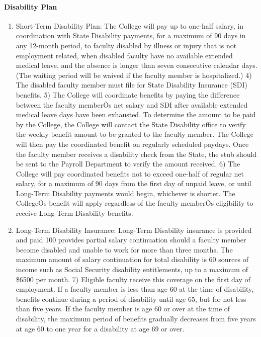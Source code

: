 \documentclass[letterpaper, 11pt]{article}
\begin{document}
			\paragraph{Disability Plan}
				\begin{enumerate}[label=\alph*)]
					\item{Short-Term Disability Plan:  The College will pay up to one-half salary, in coordination with State Disability payments, for a maximum of 90 days in any 12-month period, to faculty disabled by illness or injury that is not employment related, when disabled faculty have no available extended medical leave, and the absence is longer than seven consecutive calendar days.  (The waiting period will be waived if the faculty member is hospitalized.)}
					4) The disabled faculty member must file for State Disability Insurance (SDI) benefits.
					5) The College will coordinate benefits by paying the difference between the faculty memberÕs net salary and SDI after available extended medical leave days have been exhausted.  To determine the amount to be paid by the College, the College will contact the State Disability office to verify the weekly benefit amount to be granted to the faculty member.  The College will then pay the coordinated benefit on regularly scheduled paydays.  Once the faculty member receives a disability check from the State, the stub should be sent to the Payroll Department to verify the amount received.
					6) The College will pay coordinated benefits not to exceed one-half of regular net salary, for a maximum of 90 days from the first day of unpaid leave, or until Long-Term Disability payments would begin, whichever is shorter.  The CollegeÕs benefit will apply regardless of the faculty memberÕs eligibility to receive Long-Term Disability benefits.
					\item{Long-Term Disability Insurance:  Long-Term Disability insurance is provided}
					and paid 100%
					provides partial salary continuation should a faculty member become disabled and
					unable to work for more than three months.  The maximum amount of salary
					continuation for total disability is 60%
					sources of income such as Social Security disability entitlements, up to a
					maximum of \$6500 per month.
					7) Eligible faculty receive this coverage on the first day of employment.  If a faculty member is less than age 60 at the time of disability, benefits continue during a period of disability until age 65, but for not less than five years.  If the faculty member is age 60 or over at the time of disability, the maximum period of benefits gradually decreases from five years at age 60 to one year for a disability at age 69 or over.

\end{enumerate}
\end{document}
